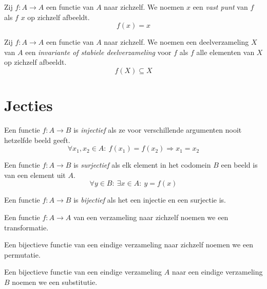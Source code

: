 \documentclass[main.tex]{subfiles}
\begin{document}
\begin{de}
  Zij $f: A \rightarrow A$ een functie van $A$ naar zichzelf.
  We noemen $x$ een \emph{vast punt} van $f$ als $f$ $x$ op zichzelf afbeeldt.
  \[ f(x) = x \]
\end{de}

\begin{de}
  Zij $f: A \rightarrow A$ een functie van $A$ naar zichzelf.
  We noemen een deelverzameling $X$ van $A$ een \emph{invariante of stabiele deelverzameling} voor $f$ als $f$ alle elementen van $X$ op zichzelf afbeeldt.
  \[ f(X) \subseteq X \]
\end{de}

\section{Jecties}
\label{sec:jecties}

\begin{de}
  Een functie $f: A \rightarrow B$ is \emph{injectief} als ze voor verschillende argumenten nooit hetzelfde beeld geeft.
  \[ \forall x_{1},x_{2} \in A:\ f(x_{1}) = f(x_{2}) \Rightarrow x_{1}= x_{2} \]
\end{de}

\begin{de}
  Een functie $f: A \rightarrow B$ is \emph{surjectief} als elk element in het codomein $B$ een beeld is van een element uit $A$.
  \[ \forall y \in B:\ \exists x \in A:\ y = f(x) \]
\end{de}

\begin{de}
  Een functie $f: A \rightarrow B$ is \emph{bijectief} als het een injectie en een surjectie is.
\end{de}

\begin{de}
  Een functie $f: A \rightarrow A$ van een verzameling naar zichzelf noemen we een transformatie.
\end{de}

\begin{de}
  Een bijectieve functie van een eindige verzameling naar zichzelf noemen we een permutatie.
\end{de}

\begin{de}
  Een bijectieve functie van een eindige verzameling $A$ naar een eindige verzameling $B$ noemen we een substitutie. 
\end{de}
\end{document}
